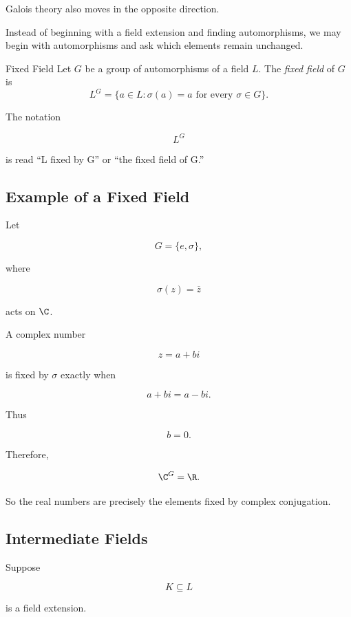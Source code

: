 Galois theory also moves in the opposite direction.

Instead of beginning with a field extension and finding automorphisms, we may
begin with automorphisms and ask which elements remain unchanged.

\begin{definitionbox}{Fixed Field}
Let \(G\) be a group of automorphisms of a field \(L\). The \emph{fixed field}
of \(G\) is
\[ L^G=\{a\in L:\sigma(a)=a\text{ for every }\sigma\in G\}. \]
\end{definitionbox}

The notation

\[ L^G \]

is read ``L fixed by G'' or ``the fixed field of G.''

\subsection{Example of a Fixed Field}
\label{subsec:fixed-field-complex}

Let

\[ G=\{e,\sigma\}, \]

where

\[ \sigma(z)=\overline z \]

acts on \(\C\).

A complex number

\[ z=a+bi \]

is fixed by \(\sigma\) exactly when

\[ a+bi=a-bi. \]

Thus

\[ b=0. \]

Therefore,

\[ \C^G=\R. \]

So the real numbers are precisely the elements fixed by complex conjugation.

\subsection{Intermediate Fields}
\label{subsec:galois-intermediate-fields}

Suppose

\[ K\subseteq L \]

is a field extension.

